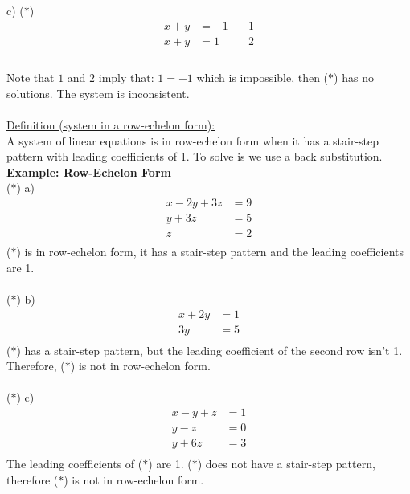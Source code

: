 \documentclass{jhwhw}
\begin{document}
c) (\(\ast\)) \begin{align*} 
x+y&=-1 \quad &\boxed{1}\\
x+y&=1 \quad &\boxed{2}\\
\end{align*}
\\
Note that \(\boxed{1}\) and \(\boxed{2}\) imply that: \(1=-1\) which is impossible, then (\(\ast\)) has no solutions. The system is inconsistent.
\\ \\

\underline{Definition (system in a row-echelon form):}
\\ 

A system of linear equations is in row-echelon form when it has a stair-step pattern with leading coefficients of 1. To solve is we use a back substitution.
\\

\textbf{Example: Row-Echelon Form}
\\

(\(\ast\)) a) \begin{align*} 
x-2y+3z&=9 \\
y+3z &= 5 \\
z&=2 \\
\end{align*}
(\(\ast\)) is in row-echelon form, it has a stair-step pattern and the leading coefficients are 1.
\\ \\

(\(\ast\)) b) \begin{align*} 
x+2y &=1 \\
3y &=5 \\
\end{align*}
(\(\ast\)) has a stair-step pattern, but the leading coefficient of the second row isn't 1. Therefore, (\(\ast\)) is not in row-echelon form.
\\ \\

(\(\ast\)) c) \begin{align*} 
x-y+z&=1\\
y-z&=0\\
y+6z&=3\\
\end{align*}
The leading coefficients of (\(\ast\)) are 1. (\(\ast\)) does not have a stair-step pattern, therefore (\(\ast\)) is not in row-echelon form.
\\ \\
\end{document}
